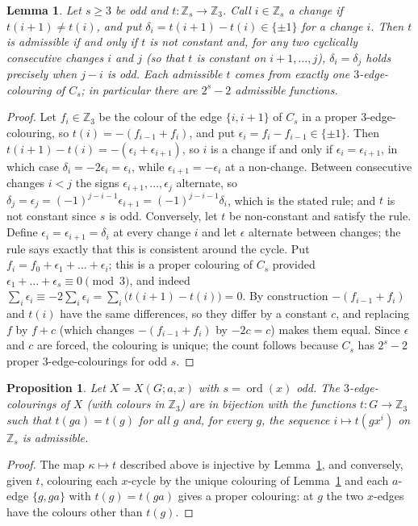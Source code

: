 \documentclass[11pt,a4paper]{article}
\newtheorem{proposition}[theorem]{Proposition}
\newtheorem{lemma}[theorem]{Lemma}
\theoremstyle{definition}
\theoremstyle{remark}
\newcommand{\ord}{\operatorname{ord}}
\newcommand{\ZZ}{\mathbb{Z}}
\newcommand{\X}[3]{X(#1;#2,#3)}
\begin{document}
\begin{lemma}\label{lem:admissible}
Let $s\ge3$ be odd and $t\colon\ZZ_s\to\ZZ_3$.  Call $i\in\ZZ_s$ a \emph{change} if $t(i+1)\ne t(i)$, and put $\delta_i=t(i+1)-t(i)\in\{\pm1\}$ for a change $i$.  Then $t$ is admissible if and only if $t$ is not constant and, for any two cyclically consecutive changes $i$ and $j$ (so that $t$ is constant on $i+1,\dots,j$), $\delta_i=\delta_j$ holds precisely when $j-i$ is odd.  Each admissible $t$ comes from exactly one $3$-edge-colouring of $C_s$; in particular there are $2^s-2$ admissible functions.
\end{lemma}
\begin{proof}
Let $f_i\in\ZZ_3$ be the colour of the edge $\{i,i+1\}$ of $C_s$ in a proper $3$-edge-colouring, so $t(i)=-(f_{i-1}+f_i)$, and put $\epsilon_i=f_i-f_{i-1}\in\{\pm1\}$.  Then $t(i+1)-t(i)=-(\epsilon_i+\epsilon_{i+1})$, so $i$ is a change if and only if $\epsilon_i=\epsilon_{i+1}$, in which case $\delta_i=-2\epsilon_i=\epsilon_i$, while $\epsilon_{i+1}=-\epsilon_i$ at a non-change.  Between consecutive changes $i<j$ the signs $\epsilon_{i+1},\dots,\epsilon_j$ alternate, so $\delta_j=\epsilon_j=(-1)^{j-i-1}\epsilon_{i+1}=(-1)^{j-i-1}\delta_i$, which is the stated rule; and $t$ is not constant since $s$ is odd.  Conversely, let $t$ be non-constant and satisfy the rule.  Define $\epsilon_{i}=\epsilon_{i+1}=\delta_i$ at every change $i$ and let $\epsilon$ alternate between changes; the rule says exactly that this is consistent around the cycle.  Put $f_i=f_0+\epsilon_1+\dots+\epsilon_i$; this is a proper colouring of $C_s$ provided $\epsilon_1+\dots+\epsilon_s\equiv0\pmod 3$, and indeed $\sum_i\epsilon_i\equiv-2\sum_i\epsilon_i=\sum_i\bigl(t(i+1)-t(i)\bigr)=0$.  By construction $-(f_{i-1}+f_i)$ and $t(i)$ have the same differences, so they differ by a constant $c$, and replacing $f$ by $f+c$ (which changes $-(f_{i-1}+f_i)$ by $-2c=c$) makes them equal.  Since $\epsilon$ and $c$ are forced, the colouring is unique; the count follows because $C_s$ has $2^s-2$ proper $3$-edge-colourings for odd $s$.
\end{proof}

\begin{proposition}\label{prop:Z3}
Let $X=\X{G}{a}{x}$ with $s=\ord(x)$ odd.  The $3$-edge-colourings of $X$ (with colours in $\ZZ_3$) are in bijection with the functions $t\colon G\to\ZZ_3$ such that $t(ga)=t(g)$ for all $g$ and, for every $g$, the sequence $i\mapsto t(gx^i)$ on $\ZZ_s$ is admissible.
\end{proposition}
\begin{proof}
The map $\kappa\mapsto t$ described above is injective by Lemma~\ref{lem:admissible}, and conversely, given $t$, colouring each $x$-cycle by the unique colouring of Lemma~\ref{lem:admissible} and each $a$-edge $\{g,ga\}$ with $t(g)=t(ga)$ gives a proper colouring: at $g$ the two $x$-edges have the colours other than $t(g)$.
\end{proof}
\end{document}
